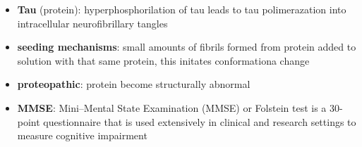 \documentclass[fleqn]{article}\usepackage{caption}
\begin{document}
\begin{itemize}
\item \textbf{Tau} (protein): hyperphosphorilation of tau leads to tau polimerazation into intracellular neurofibrillary tangles %

\item \textbf{seeding mechanisms}: small amounts of fibrils formed from protein added to solution with that same protein, this initates conformationa change

\item \textbf{proteopathic}: protein become structurally abnormal

\item \textbf{MMSE}:  Mini–Mental State Examination (MMSE) or Folstein test is a 30-point questionnaire that is used extensively in clinical and research settings to measure cognitive impairment
\end{itemize}
\end{document}
